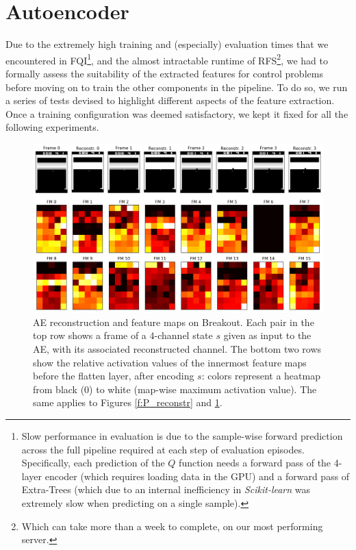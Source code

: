 \section{Autoencoder}
Due to the extremely high training and (especially) evaluation times that we 
encountered in FQI\footnote{Slow performance in evaluation is due to the 
sample-wise forward prediction across the full pipeline required at each step
of evaluation episodes. Specifically, each prediction of the $Q$ function needs 
a forward pass of the 4-layer encoder (which requires loading data in the GPU)
and a forward pass of Extra-Trees (which due to an internal inefficiency in 
\textit{Scikit-learn} was extremely slow when predicting on a single sample).},
and the almost intractable runtime of RFS\footnote{Which can take more than a 
week to complete, on our most performing server.}, we had to formally assess the 
suitability of the extracted features for control problems before moving on to 
train the other components in the pipeline. 
To do so, we run a series of tests devised to highlight different aspects of
the feature extraction. Once a training configuration was deemed satisfactory, 
we kept it fixed for all the following experiments.
%
\begin{figure}
    \includegraphics[width=\textwidth]{pictures/experiments/reconstr_breakout}
    \centering
    \caption[AE reconstruction and feature maps on Breakout]{AE reconstruction 
    and feature maps on Breakout. 
    Each pair in the top row shows a frame of a $4$-channel state $s$ given as input 
    to the AE, with its associated 
    reconstructed channel. The bottom two rows show the relative activation values 
    of the innermost feature maps before the flatten layer, after encoding $s$: 
    colors represent a heatmap from black ($0$) to white (map-wise maximum 
    activation value). The same applies to Figures \ref{f:P_reconstr} and 
    \ref{f:BO_reconstr}.}
    \label{f:BO_reconstr}
\end{figure}
